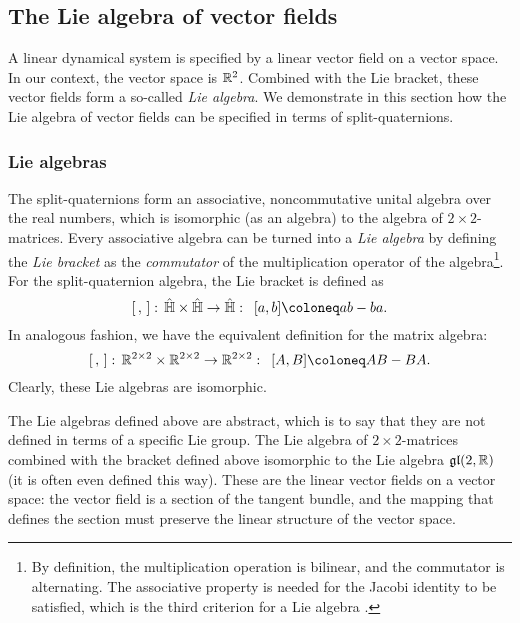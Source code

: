 \subsection{The Lie algebra of vector fields}
\label{ssec:vf_algebra}
A linear dynamical system is specified by a linear vector field on a vector space. In our context, the vector space is $\mathbb{R}^2$. Combined with the Lie bracket, these vector fields form a so-called \emph{Lie algebra}. We demonstrate in this section how the Lie algebra of vector fields can be specified in terms of split-quaternions.

\subsubsection{Lie algebras}
The split-quaternions form an associative, noncommutative unital algebra over the real numbers, which is isomorphic (as an algebra) to the algebra of $2\times 2$-matrices. Every associative algebra can be turned into a \emph{Lie algebra} by defining the \emph{Lie bracket} as the \emph{commutator} of the multiplication operator of the algebra\footnote{By definition, the multiplication operation is bilinear, and the commutator is alternating. The associative property is needed for the Jacobi identity to be satisfied, which is the third criterion for a Lie algebra \cite{bourbaki1975}.}. For the split-quaternion algebra, the Lie bracket is defined as
\begin{equation}
    \liebr{\,}{}:\, \spquaternions \times \spquaternions \to \spquaternions: \;\: [a, b] \coloneq ab - ba.
\end{equation}
In analogous fashion, we have the equivalent definition for the matrix algebra:
\begin{equation}
    \liebr{\,}{}:\, \real^{2\times 2} \times \real^{2\times 2} \to \real^{2\times 2}: \;\: [A, B] \coloneq AB - BA.
\end{equation}
Clearly, these Lie algebras are isomorphic.

The Lie algebras defined above are abstract, which is to say that they are not defined in terms of a specific Lie group. The Lie algebra of $2\times 2$-matrices combined with the bracket defined above isomorphic to the Lie algebra $\mathfrak{gl}(2, \mathbb{R})$ (it is often even defined this way). These are the linear vector fields on a vector space: the vector field is a section of the tangent bundle, and the mapping that defines the section must preserve the linear structure of the vector space. 

